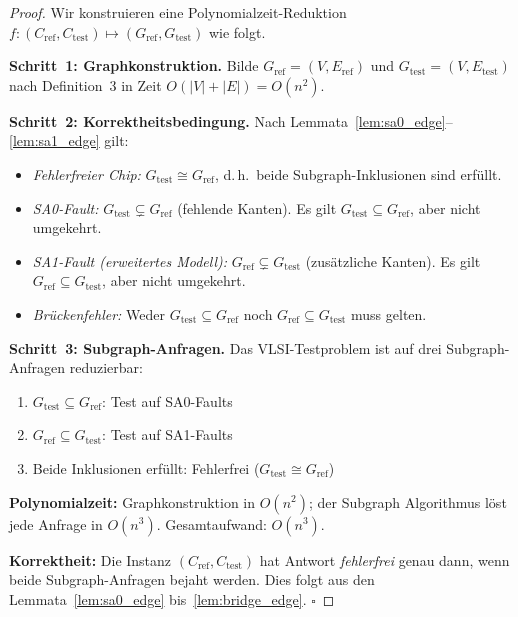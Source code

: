 ﻿\documentclass[a4paper,12pt]{article}
\theoremstyle{definition}
\begin{document}
\begin{proof}
  Wir konstruieren eine Polynomialzeit-Reduktion
  $f: (C_{\mathrm{ref}}, C_{\mathrm{test}}) \mapsto
  (G_{\mathrm{ref}}, G_{\mathrm{test}})$ wie folgt.

  \textbf{Schritt~1: Graph\-konstruktion.}
  Bilde $G_{\mathrm{ref}} = (V, E_{\mathrm{ref}})$ und
  $G_{\mathrm{test}} = (V, E_{\mathrm{test}})$ nach Definition~3
  in Zeit $O(|V| + |E|) = O(n^2)$.

  \textbf{Schritt~2: Korrektheitsbedingung.}
  Nach Lemmata~\ref{lem:sa0_edge}--\ref{lem:sa1_edge} gilt:
  \begin{itemize}
    \item \emph{Fehlerfreier Chip:} $G_{\mathrm{test}} \cong G_{\mathrm{ref}}$,
          d.\,h.\ beide Subgraph-Inklusionen sind erfüllt.
    \item \emph{SA0-Fault:} $G_{\mathrm{test}} \subsetneq G_{\mathrm{ref}}$
          (fehlende Kanten). Es gilt
          $G_{\mathrm{test}} \subseteq G_{\mathrm{ref}}$,
          aber nicht umgekehrt.
    \item \emph{SA1-Fault (erweitertes Modell):}
          $G_{\mathrm{ref}} \subsetneq G_{\mathrm{test}}$
          (zusätzliche Kanten). Es gilt
          $G_{\mathrm{ref}} \subseteq G_{\mathrm{test}}$,
          aber nicht umgekehrt.
    \item \emph{Brückenfehler:} Weder
          $G_{\mathrm{test}} \subseteq G_{\mathrm{ref}}$ noch
          $G_{\mathrm{ref}} \subseteq G_{\mathrm{test}}$ muss gelten.
  \end{itemize}

  \textbf{Schritt~3: Subgraph-Anfragen.}
  Das VLSI-Testproblem ist auf drei Subgraph-Anfragen reduzierbar:
  \begin{enumerate}
    \item[(i)]   $G_{\mathrm{test}} \subseteq G_{\mathrm{ref}}$:
                 Test auf SA0-Faults
    \item[(ii)]  $G_{\mathrm{ref}} \subseteq G_{\mathrm{test}}$:
                 Test auf SA1-Faults
    \item[(iii)] Beide Inklusionen erfüllt: Fehlerfrei
                 ($G_{\mathrm{test}} \cong G_{\mathrm{ref}}$)
  \end{enumerate}

  \textbf{Polynomialzeit:} Graphkonstruktion in $O(n^2)$; der
  Subgraph Algorithmus löst jede Anfrage in $O(n^3)$.
  Gesamtaufwand: $O(n^3)$.

  \textbf{Korrektheit:} Die Instanz
  $(C_{\mathrm{ref}}, C_{\mathrm{test}})$ hat Antwort
  \emph{fehlerfrei} genau dann, wenn beide Subgraph-Anfragen bejaht
  werden. Dies folgt aus den Lemmata~\ref{lem:sa0_edge}
  bis~\ref{lem:bridge_edge}. $\square$
\end{proof}
\end{document}
